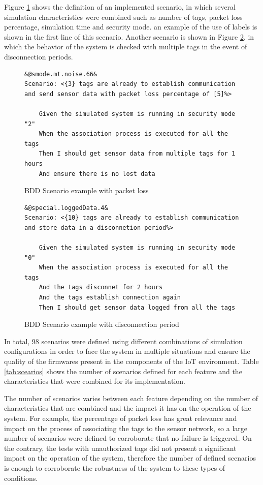 \documentclass[journal]{IEEEtran}	%
\begin{document}
Figure \ref{fig:bddScenario1} shows the definition of an implemented scenario, in which several simulation characteristics were combined such as number of tags, packet loss percentage, simulation time and security mode. an example of the use of labels is shown in the first line of this scenario. Another scenario is shown in Figure \ref{fig:bddScenario2}, in which the behavior of the system is checked with multiple tags in the event of disconnection periods.

\begin{figure}[H]
\centering
\begin{lstlisting}[style=scenarioStyle]
&@smode.mt.noise.66&
Scenario: <{3} tags are already to establish communication and send sensor data with packet loss percentage of [5]%>
    
    Given the simulated system is running in security mode "2"
    When the association process is executed for all the tags
    Then I should get sensor data from multiple tags for 1 hours
    And ensure there is no lost data
\end{lstlisting}
\caption{BDD Scenario example with packet loss}
\label{fig:bddScenario1}
\end{figure}

\begin{figure}[t]
\centering
\begin{lstlisting}[style=scenarioStyle]
&@special.loggedData.4&
Scenario: <{10} tags are already to establish communication and store data in a disconnetion period%>
    
    Given the simulated system is running in security mode "0"
    When the association process is executed for all the tags
    And the tags disconnet for 2 hours
    And the tags establish connection again
    Then I should get sensor data logged from all the tags
\end{lstlisting}
\caption{BDD Scenario example with disconnection period}
\label{fig:bddScenario2}
\end{figure}

In total, 98 scenarios were defined using different combinations of simulation configurations in order to face the system in multiple situations and ensure the quality of the firmwares present in the components of the IoT environment. Table \ref{tab:scearios} shows the number of scenarios defined for each feature and the characteristics that were combined for its implementation.

The number of scenarios varies between each feature depending on the number of characteristics that are combined and the impact it has on the operation of the system. For example, the percentage of packet loss has great relevance and impact on the process of associating the tags to the sensor network, so a large number of scenarios were defined to corroborate that no failure is triggered. On the contrary, the tests with unauthorized tags did not present a significant impact on the operation of the system, therefore the number of defined scenarios is enough to corroborate the robustness of the system to these types of conditions.
\end{document}
